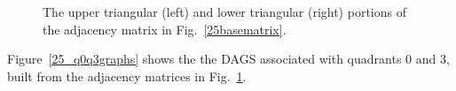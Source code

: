 \documentclass[times,final]{elsarticle}
\begin{document}
\begin{figure}[H]
\begin{minipage}[c]{0.5\textwidth}
\centering
{}
\end{minipage}
\begin{minipage}[c]{0.5\textwidth}
\centering
{}
\end{minipage}
\caption{The upper triangular (left) and lower triangular (right) portions of the adjacency matrix in Fig.~\ref{25basematrix}.}
\label{25baseportionmatrices}
\end{figure}
Figure~\ref{25_q0q3graphs} shows the the DAGS associated with quadrants 0 and 3, built from the adjacency matrices in Fig.~\ref{25baseportionmatrices}.
\end{document}
